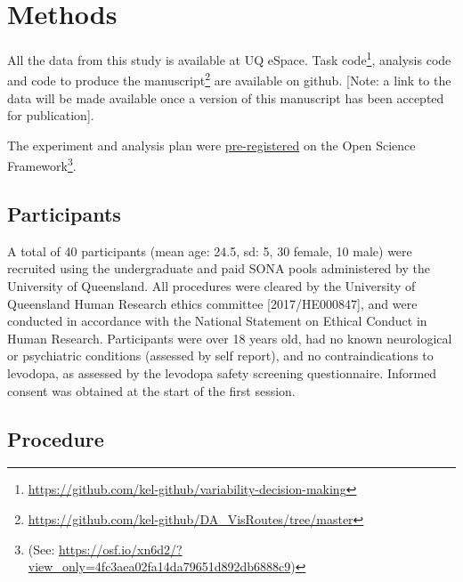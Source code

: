 \documentclass[
  man]{apa6}
\begin{document}
\hypertarget{methods}{%
\section{Methods}\label{methods}}

\label{sec:Methods}

All the data from this study is available at UQ eSpace. Task code\footnote{\url{https://github.com/kel-github/variability-decision-making}}, analysis code and code to produce the manuscript\footnote{\url{https://github.com/kel-github/DA_VisRoutes/tree/master}} are available on github. {[}Note: a link to the data will be made available once a version of this manuscript has been accepted for publication{]}.

The experiment and analysis plan were \href{https://osf.io/xn6d2/?view_only=4fc3aea02fa14da79651d892db6888c9}{pre-registered} on the Open Science Framework\footnote{(See: \url{https://osf.io/xn6d2/?view_only=4fc3aea02fa14da79651d892db6888c9})}.

\hypertarget{participants}{%
\subsection{Participants}\label{participants}}

\label{sec:Participants}

A total of 40 participants (mean age: 24.5, sd: 5, 30 female, 10 male) were recruited using the undergraduate and paid SONA pools administered by the University of Queensland. All procedures were cleared by the University of Queensland Human Research ethics committee {[}2017/HE000847{]}, and were conducted in accordance with the National Statement on Ethical Conduct in Human Research. Participants were over 18 years old, had no known neurological or psychiatric conditions (assessed by self report), and no contraindications to levodopa, as assessed by the levodopa safety screening questionnaire. Informed consent was obtained at the start of the first session.

\hypertarget{procedure}{%
\subsection{Procedure}\label{procedure}}

\label{sec:Procedure}
\end{document}
